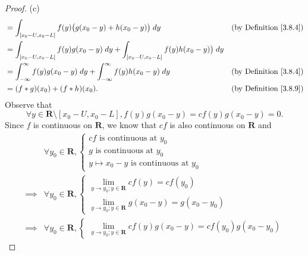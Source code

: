\begin{proof}{(c)}
\begin{align*}
         & = \int_{[x_0 - U, x_0 - L]} f(y) \big(g(x_0 - y) + h(x_0 - y)\big) \; dy                                 & \text{(by Definition \ref{3.8.4})} \\
         & = \int_{[x_0 - U, x_0 - L]} f(y) g(x_0 - y) \; dy + \int_{[x_0 - U, x_0 - L]} f(y) h(x_0 - y)\big) \; dy                                      \\
         & = \int_{-\infty}^\infty f(y) g(x_0 - y) \; dy + \int_{-\infty}^\infty f(y) h(x_0 - y) \; dy              & \text{(by Definition \ref{3.8.4})} \\
         & = (f * g)(x_0) + (f * h)(x_0).                                                                           & \text{(by Definition \ref{3.8.9})}
    \end{align*}
    Observe that
    \[
        \forall y \in \mathbf{R} \setminus [x_0 - U, x_0 - L], f(y) g(x_0 - y) = c f(y) g(x_0 - y) = 0.
    \]
    Since \(f\) is continuous on \(\mathbf{R}\), we know that \(cf\) is also continuous on \(\mathbf{R}\) and
    \begin{align*}
                 & \forall y_0 \in \mathbf{R}, \begin{cases}
                                                   cf \text{ is continuous at } y_0 \\
                                                   g \text{ is continuous at } y_0  \\
                                                   y \mapsto x_0 - y \text{ is continuous at } y_0
                                               \end{cases}                                          \\
        \implies & \forall y_0 \in \mathbf{R}, \begin{cases}
                                                   \lim_{y \to y_0 ; y \in \mathbf{R}} cf(y) = cf(y_0) \\
                                                   \lim_{y \to y_0 ; y \in \mathbf{R}} g(x_0 - y) = g(x_0 - y_0)
                                               \end{cases}               \\
        \implies & \forall y_0 \in \mathbf{R}, \begin{cases}
                                                   \lim_{y \to y_0 ; y \in \mathbf{R}} cf(y) g(x_0 - y) = cf(y_0) g(x_0 - y_0)
                                               \end{cases}
    \end{align*}

\end{proof}

